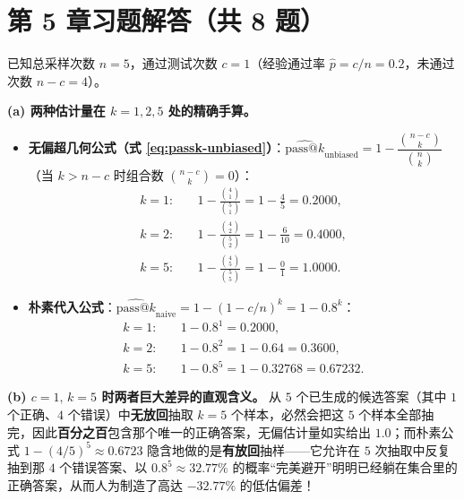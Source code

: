 \section*{第 5 章习题解答（共 8 题）}


已知总采样次数 $n = 5$，通过测试次数 $c = 1$（经验通过率 $\hat{p} = c/n = 0.2$，未通过次数 $n - c = 4$）。

\textbf{(a) 两种估计量在 $k = 1, 2, 5$ 处的精确手算。}
\begin{itemize}
  \item \textbf{无偏超几何公式（式 \eqref{eq:passk-unbiased}）}：$\widehat{\mathrm{pass@}k}_{\text{unbiased}} = 1 - \dfrac{\binom{n-c}{k}}{\binom{n}{k}}$（当 $k > n - c$ 时组合数 $\binom{n-c}{k} = 0$）：
  \begin{align*}
    k = 1:\quad & 1 - \frac{\binom{4}{1}}{\binom{5}{1}} = 1 - \frac{4}{5} = \mathbf{0.2000}, \\
    k = 2:\quad & 1 - \frac{\binom{4}{2}}{\binom{5}{2}} = 1 - \frac{6}{10} = \mathbf{0.4000}, \\
    k = 5:\quad & 1 - \frac{\binom{4}{5}}{\binom{5}{5}} = 1 - \frac{0}{1} = \mathbf{1.0000}.
  \end{align*}
  \item \textbf{朴素代入公式}：$\widehat{\mathrm{pass@}k}_{\text{naive}} = 1 - (1 - c/n)^k = 1 - 0.8^k$：
  \begin{align*}
    k = 1:\quad & 1 - 0.8^1 = \mathbf{0.2000}, \\
    k = 2:\quad & 1 - 0.8^2 = 1 - 0.64 = \mathbf{0.3600}, \\
    k = 5:\quad & 1 - 0.8^5 = 1 - 0.32768 = \mathbf{0.67232}.
  \end{align*}
\end{itemize}

\textbf{(b) $c = 1,\, k = 5$ 时两者巨大差异的直观含义。}
从 $5$ 个已生成的候选答案（其中 $1$ 个正确、$4$ 个错误）中\textbf{无放回}抽取 $k = 5$ 个样本，必然会把这 $5$ 个样本全部抽完，因此\textbf{百分之百}包含那个唯一的正确答案，无偏估计量如实给出 $1.0$；而朴素公式 $1 - (4/5)^5 \approx 0.6723$ 隐含地做的是\textbf{有放回}抽样——它允许在 $5$ 次抽取中反复抽到那 $4$ 个错误答案、以 $0.8^5 \approx 32.77\%$ 的概率“完美避开”明明已经躺在集合里的正确答案，从而人为制造了高达 $-32.77\%$ 的低估偏差！


